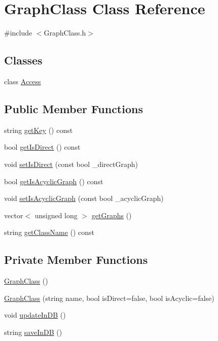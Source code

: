 \hypertarget{class_graph_class}{}\section{Graph\+Class Class Reference}
\label{class_graph_class}


{\ttfamily \#include $<$Graph\+Class.\+h$>$}

\subsection*{Classes}
\begin{DoxyCompactItemize}
\item 
class \hyperlink{class_graph_class_1_1_access}{Access}
\end{DoxyCompactItemize}
\subsection*{Public Member Functions}
\begin{DoxyCompactItemize}
\item 
string \hyperlink{class_graph_class_a6db9defb88a0810757b027a157ae08be}{get\+Key} () const 
\item 
bool \hyperlink{class_graph_class_a1e4be5a74964e66e8305156fdec586d0}{get\+Is\+Direct} () const 
\item 
void \hyperlink{class_graph_class_a1cd203739e4a86b9ce105218416f1ffb}{set\+Is\+Direct} (const bool \+\_\+direct\+Graph)
\item 
bool \hyperlink{class_graph_class_a5329cb65c74cab88562559ae9982730b}{get\+Is\+Acyclic\+Graph} () const 
\item 
void \hyperlink{class_graph_class_aa18b6207298d575a56927aa71cd001f5}{set\+Is\+Acyclic\+Graph} (const bool \+\_\+acyclic\+Graph)
\item 
vector$<$ unsigned long $>$ \hyperlink{class_graph_class_ab6823493e22ab73786bb19ee29a59cda}{get\+Graphs} ()
\item 
string \hyperlink{class_graph_class_aaec204cc25ab18def2baf8394184ccdd}{get\+Class\+Name} () const 
\end{DoxyCompactItemize}
\subsection*{Private Member Functions}
\begin{DoxyCompactItemize}
\item 
\hyperlink{class_graph_class_a39d78244b77de2351494de80b28e7dbe}{Graph\+Class} ()
\item 
\hyperlink{class_graph_class_a8eea1081ee50465f3b12d45f8559a1b1}{Graph\+Class} (string name, bool is\+Direct=false, bool is\+Acyclic=false)
\item 
void \hyperlink{class_graph_class_ab0cb35508a11b51d565cbf3ac26c309c}{update\+In\+D\+B} ()
\item 
string \hyperlink{class_graph_class_a067c49d5933ac4eecb19609bdf4d2a5c}{save\+In\+D\+B} ()
\end{DoxyCompactItemize}
